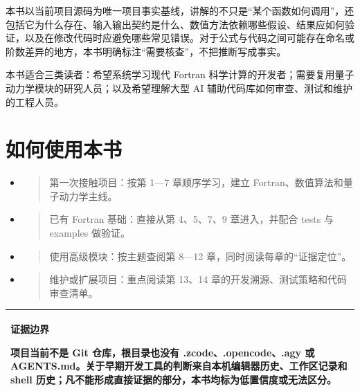 \documentclass[UTF8,openany,11pt,fontset=fandol]{ctexbook}
\begin{document}
本书以当前项目源码为唯一项目事实基线，讲解的不只是``某个函数如何调用''，还包括它为什么存在、输入输出契约是什么、数值方法依赖哪些假设、结果应如何验证，以及在修改代码时应避免哪些常见错误。对于公式与代码之间可能存在命名或阶数差异的地方，本书明确标注``需要核查''，不把推断写成事实。

本书适合三类读者：希望系统学习现代 Fortran
科学计算的开发者；需要复用量子动力学模块的研究人员；以及希望理解大型 AI
辅助代码库如何审查、测试和维护的工程人员。

\hypertarget{ux5982ux4f55ux4f7fux7528ux672cux4e66}{%
\section{\texorpdfstring{\textbf{如何使用本书}}{如何使用本书}}\label{ux5982ux4f55ux4f7fux7528ux672cux4e66}}

\begin{itemize}
\item
  \begin{quote}
  第一次接触项目：按第 1---7 章顺序学习，建立
  Fortran、数值算法和量子动力学主线。
  \end{quote}
\item
  \begin{quote}
  已有 Fortran 基础：直接从第 4、5、7、9 章进入，并配合 tests 与
  examples 做验证。
  \end{quote}
\item
  \begin{quote}
  使用高级模块：按主题查阅第 8---12 章，同时阅读每章的``证据定位''。
  \end{quote}
\item
  \begin{quote}
  维护或扩展项目：重点阅读第 13、14
  章的开发溯源、测试策略和代码审查清单。
  \end{quote}
\end{itemize}

\begin{longtable}[]{@{}l@{}}
\toprule
\endhead
\begin{minipage}[t]{0.97\columnwidth}\raggedright
\textbf{证据边界}

项目当前不是 Git 仓库，根目录也没有 .zcode、.opencode、.agy 或
AGENTS.md。关于早期开发工具的判断来自本机编辑器历史、工作区记录和 shell
历史；凡不能形成直接证据的部分，本书均标为低置信度或无法区分。\strut
\end{minipage}\tabularnewline
\bottomrule
\end{longtable}

\tableofcontents
\mainmatter
\end{document}
